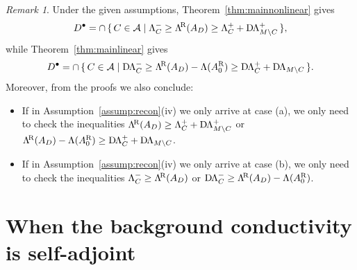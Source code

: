 \documentclass[reqno]{amsart}
\numberwithin{equation}{section}
\numberwithin{figure}{section}
\numberwithin{table}{section}
\theoremstyle{plain}
\theoremstyle{definition}
\theoremstyle{remark}
\newtheorem{remark}[theorem]{Remark}
\newcommand{\upR}{^{\textup{R}}}
\newcommand{\uptR}{^{\!\textup{R}}}
\newcommand{\LambdaR}{\Lambda\uptR}
\newcommand{\AR}{A\upR}
\newcommand{\DLambda}{\textup{D}\mkern-1.5mu \Lambda}
\begin{document}
	\begin{remark}
		Under the given assumptions, Theorem~\ref{thm:mainnonlinear} gives
		\begin{equation*}
			D^\bullet = \cap\, \{\, C\in\mathcal{A} \mid \Lambda^-_{C} \geq \LambdaR(A_D) \geq \Lambda^+_{C}+\DLambda_{M\setminus C}^+ \,\},
		\end{equation*}
		while Theorem~\ref{thm:mainlinear} gives
		\begin{equation*}
			D^\bullet = \cap\, \{\, C\in\mathcal{A} \mid \DLambda^-_{C} \geq \LambdaR(A_D) - \Lambda(\AR_0) \geq \DLambda^+_{C}+\DLambda_{M\setminus C} \,\}.
		\end{equation*}
		Moreover, from the proofs we also conclude:
		\begin{itemize}
			\item If in Assumption~\ref{assump:recon}(iv) we only arrive at case (a), we only need to check the inequalities $\LambdaR(A_D) \geq \Lambda^+_{C}+\DLambda_{M\setminus C}^+$ or $\LambdaR(A_D) - \Lambda(\AR_0) \geq \DLambda^+_{C}+\DLambda_{M\setminus C}$.
			\item If in Assumption~\ref{assump:recon}(iv) we only arrive at case (b), we only need to check the inequalities $\Lambda^-_{C} \geq \LambdaR(A_D)$ or $\DLambda^-_{C} \geq \LambdaR(A_D) - \Lambda(\AR_0)$.
		\end{itemize} 
	\end{remark}
	
	\section{When the background conductivity is self-adjoint} \label{sec:SA}
	
\end{document}
